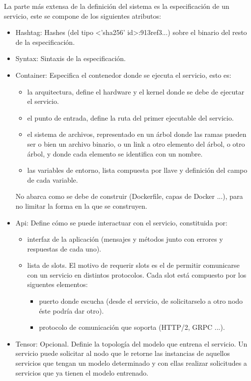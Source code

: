 \documentclass[11pt]{article}
\begin{document}
			La parte más extensa de la definición del sistema es la especificación de un servicio, este se compone de los siguientes atributos:\\
			\begin{itemize}
				\item Hashtag: Hashes (del tipo <'sha256' id>:913ref3...) sobre el binario del resto de la especificación.
				\item Syntax: Sintaxis de la especificación.
				\item Container: Especifica el contenedor donde se ejecuta el servicio, esto es:
					\begin{itemize}
						\item la arquitectura, define el hardware y el kernel donde se debe de ejecutar el servicio.
						\item el punto de entrada, define la ruta del primer ejecutable del servicio.
						\item el sistema de archivos, representado en un árbol donde las ramas pueden ser o bien un archivo binario, o un link a otro elemento del árbol, o otro árbol,
							y donde cada elemento se identifica con un nombre.
						\item las variables de entorno, lista compuesta por llave y definición del campo de cada variable.
					\end{itemize} 
					No abarca como se debe de construir (Dockerfile, capas de Docker ...), para no limitar la forma en la que se construyen.
				\item Api: Define cómo se puede interactuar con el servicio, constituida por:
					\begin{itemize}
						\item interfaz de la aplicación (mensajes y métodos junto con errores y respuestas de cada uno).
						\item lista de slots. El motivo de requerir slots es el de permitir comunicarse con un servicio en distintos protocolos.
						Cada slot está compuesto por los siguentes elementos:
							\begin{itemize}
								\item puerto donde escucha (desde el servicio, de solicitarselo a otro nodo éste podría dar otro).
								\item protocolo de comunicación que soporta (HTTP/2, GRPC ...).
							\end{itemize}
					\end{itemize}
				\item Tensor: Opcional. Definie la topología del modelo que entrena el servicio. Un servicio puede solicitar al nodo que le retorne las instancias
					de aquellos servicios que tengan un modelo determinado y con ellas realizar solicitudes a servicios que ya tienen el modelo entrenado.
			\end{itemize}			
\end{document}
